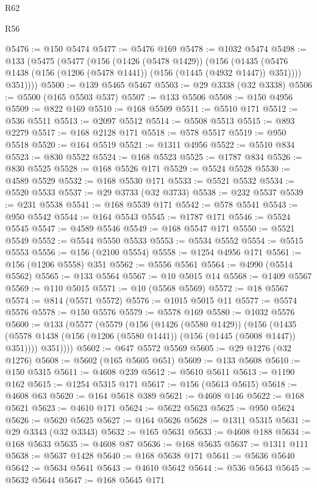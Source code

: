 \begin{lexlean}{R62}
\begin{lexlean}{R56}
\begin{coremodule}
{{{{{{{{{{{{{{{{{{{{{{{{{{{{{{{{{{{{{{{{{{{{{{{{{{{{{{{{{{{{{{{{{{{{{{{{{{{{{{{{{{{{{{{{{{{{{{{{{{{{{{{{{{{{{{{{{{{{{{{{{{{{{{{{{{{{{{{{{{{{{{{{{{{{{{{{{{{{{{{{{{{{{{{{{{{{{{{{{{{{{{{{{{{{{{{{{{{{{{{{{{{{{{{{{{{@5476 := @150 @5474
@5477 := @5476 @169
@5478 := @1032 @5474
@5498 := @133
    (@5475
      (@5477
        (@156
          (@1426 (@5478 @1429))
          (@156
            (@1435 (@5476 @1438 (@156 (@1206 (@5478 @1441)) (@156 (@1445 (@4932 @1447)) @351))))
            @351))))
@5500 := @139 @5465 @5467
@5503 := @29 @3338 (@32 @3338)
@5506 := @5500 (@165 @5503 @537)
@5507 := @133 @5506
@5508 := @150 @4956
@5509 := @822 @169
@5510 := @168 @5509
@5511 := @5510 @171
@5512 := @536 @5511
@5513 := @2097 @5512
@5514 := @5508 @5513
@5515 := @893 @2279
@5517 := @168 @2128 @171
@5518 := @578 @5517
@5519 := @950 @5518
@5520 := @164 @5519
@5521 := @1311 @4956
@5522 := @5510 @834
@5523 := @830 @5522
@5524 := @168 @5523
@5525 := @1787 @834
@5526 := @830 @5525
@5528 := @168 @5526 @171
@5529 := @5524 @5528
@5530 := @4589 @5529
@5532 := @168 @5530 @171
@5533 := @5521 @5532
@5534 := @5520 @5533
@5537 := @29 @3733 (@32 @3733)
@5538 := @232 @5537
@5539 := @231 @5538
@5541 := @168 @5539 @171
@5542 := @578 @5541
@5543 := @950 @5542
@5544 := @164 @5543
@5545 := @1787 @171
@5546 := @5524 @5545
@5547 := @4589 @5546
@5549 := @168 @5547 @171
@5550 := @5521 @5549
@5552 := @5544 @5550 @5533
@5553 := @5534 @5552
@5554 := @5515 @5553
@5556 := @156 (@2100 @5554)
@5558 := @1254 @4956 @171
@5561 := @156 (@1206 @5558) @351
@5562 := @5556 @5561
@5564 := @4990 (@5514 @5562)
@5565 := @133 @5564
@5567 := @10 @5015 @14
@5568 := @1409 @5567
@5569 := @110 @5015
@5571 := @10 (@5568 @5569)
@5572 := @18 @5567
@5574 := @814 (@5571 @5572)
@5576 := @1015 @5015 @11
@5577 := @5574 @5576
@5578 := @150 @5576
@5579 := @5578 @169
@5580 := @1032 @5576
@5600 := @133
    (@5577
      (@5579
        (@156
          (@1426 (@5580 @1429))
          (@156
            (@1435 (@5578 @1438 (@156 (@1206 (@5580 @1441)) (@156 (@1445 (@5008 @1447)) @351))))
            @351))))
@5602 := @647 @5572 @5569
@5605 := @29 @1276 (@32 @1276)
@5608 := @5602 (@165 @5605 @651)
@5609 := @133 @5608
@5610 := @150 @5315
@5611 := @4608 @239
@5612 := @5610 @5611
@5613 := @1190 @162
@5615 := @1254 @5315 @171
@5617 := @156 (@5613 @5615)
@5618 := @4608 @63
@5620 := @164 @5618 @389
@5621 := @4608 @146
@5622 := @168 @5621
@5623 := @4610 @171
@5624 := @5622 @5623
@5625 := @950 @5624
@5626 := @5620 @5625
@5627 := @164 @5626
@5628 := @1311 @5315
@5631 := @29 @3343 (@32 @3343)
@5632 := @165 @5631
@5633 := @4608 @188
@5634 := @168 @5633
@5635 := @4608 @87
@5636 := @168 @5635
@5637 := @1311 @111
@5638 := @5637 @1428
@5640 := @168 @5638 @171
@5641 := @5636 @5640
@5642 := @5634 @5641
@5643 := @4610 @5642
@5644 := @536 @5643
@5645 := @5632 @5644
@5647 := @168 @5645 @171
}}}}}}}}}}}}}}}}}}}}}}}}}}}}}}}}}}}}}}}}}}}}}}}}}}}}}}}}}}}}}}}}}}}}}}}}}}}}}}}}}}}}}}}}}}}}}}}}}}}}}}}}}}}}}}}}}}}}}}}}}}}}}}}}}}}}}}}}}}}}}}}}}}}}}}}}}}}}}}}}}}}}}}}}}}}}}}}}}}}}}}}}}}}}}}}}}}}}}}}}}}}}}}}}}}}
\end{coremodule}
\end{lexlean}
\end{lexlean}
